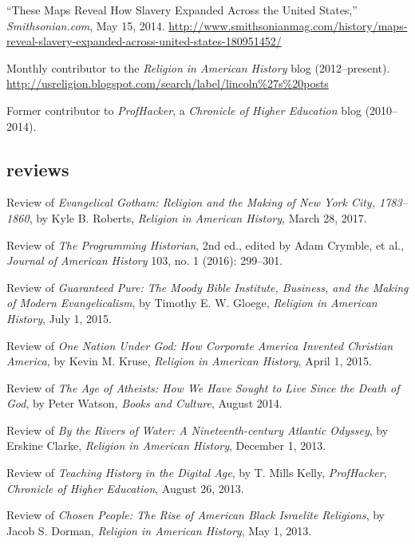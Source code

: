 \documentclass[11pt]{article}
\begin{document}
``These Maps Reveal How Slavery Expanded Across the United States,''
\emph{Smithsonian.com}, May 15, 2014. 
\url{http://www.smithsonianmag.com/history/maps-reveal-slavery-expanded-across-united-states-180951452/}

Monthly contributor to the \emph{Religion in American History} blog (2012--present). \url{http://usreligion.blogspot.com/search/label/lincoln\%27s\%20posts}

Former contributor to \emph{ProfHacker}, a \emph{Chronicle of Higher 
  Education} blog (2010--2014). 

\subsection{reviews}\label{book-reviews}

Review of \emph{Evangelical Gotham: Religion and the Making of New York City, 
  1783--1860}, by Kyle B. Roberts, \emph{Religion in American History}, March 
28, 2017.

Review of \emph{The Programming Historian}, 2nd ed., edited by
Adam Crymble, et al., \emph{Journal of American History} 103, no. 1 (2016): 
299--301.

Review of \emph{Guaranteed Pure: The Moody Bible Institute, Business, and the 
  Making of Modern Evangelicalism}, by Timothy E. W. Gloege, \emph{Religion in 
  American History}, July 1, 2015.

Review of \emph{One Nation Under God: How Corporate America Invented Christian 
  America}, by Kevin M. Kruse, \emph{Religion in American History}, April 1, 
2015.


Review of \emph{The Age of Atheists: How We Have Sought to Live Since
  the Death of God}, by Peter Watson, \emph{Books and Culture}, August
2014.

Review of \emph{By the Rivers of Water: A Nineteenth-century Atlantic
  Odyssey}, by Erskine Clarke, \emph{Religion in American History},
December 1, 2013.

Review of \emph{Teaching History in the Digital Age}, by T. Mills Kelly,
\emph{ProfHacker}, \emph{Chronicle of Higher Education}, August 26,
2013.

Review of \emph{Chosen People: The Rise of American Black Israelite
  Religions}, by Jacob S. Dorman, \emph{Religion in American History}, May
1, 2013.
\end{document}

